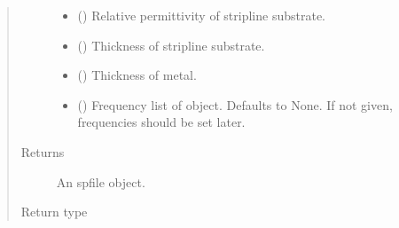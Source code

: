 \documentclass[letterpaper,10pt,english]{sphinxmanual}
\begin{document}
\begin{fulllineitems}
\begin{fulllineitems}
\begin{quote}
\begin{description}
\begin{itemize}
\item {} 
 () \textendash{} Relative permittivity of stripline substrate.

\item {} 
 () \textendash{} Thickness of stripline substrate.

\item {} 
 () \textendash{} Thickness of metal.

\item {} 
 (\sphinxstyleliteralemphasis{\sphinxupquote{, }}) \textendash{} Frequency list of object. Defaults to None. If not given, frequencies should be set later.

\end{itemize}

\item[{Returns}] \leavevmode
An spfile object.

\item[{Return type}] \leavevmode
{\hyperref[\detokenize{touchstone:touchstone.spfile}]{}}

\end{description}\end{quote}

\end{fulllineitems}



\end{fulllineitems}
\end{document}
